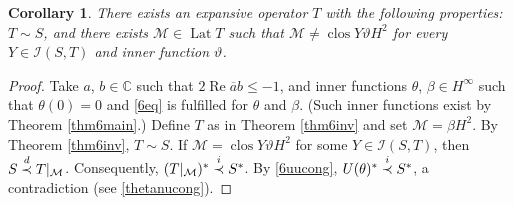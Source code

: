 \documentclass[a4paper,oneside,11pt]{amsart}
\numberwithin{equation}{section}
\theoremstyle{plain}
\newtheorem{corollary}[theorem]{Corollary}
\theoremstyle{definition}
\begin{document}
\begin{corollary} \label{cor6} There exists an expansive operator $T$ with the following properties:  $T\sim S$, and there exists 
$\mathcal M\in \operatorname{Lat}T$ such that $\mathcal M\neq\operatorname{clos}Y\vartheta H^2$ for every $Y\in\mathcal I(S,T)$ and 
inner function $\vartheta$. 
\end{corollary}

\begin{proof} Take $a$, $b\in\mathbb C$ such that $2\operatorname{Re}\overline ab\leq -1$, and inner functions
$\theta$, $\beta\in H^\infty$ such that $\theta(0)=0$ and \eqref{6eq} is fulfilled for $\theta$ and $\beta$. 
(Such inner functions exist by Theorem \ref{thm6main}.) Define $T$ as in Theorem \ref{thm6inv} and set $\mathcal M= \beta H^2$. 
By Theorem \ref{thm6inv}, $T\sim S$. If $\mathcal M=\operatorname{clos}Y\vartheta H^2$ for some $Y\in\mathcal I(S,T)$, then 
$S\buildrel d\over\prec T|_{\mathcal M}$. Consequently, $(T|_{\mathcal M})^*\buildrel i\over\prec S^*$. 
By \eqref{6uucong}, $U(\theta)^* \buildrel i\over\prec S^*$, a contradiction (see \eqref{thetanucong}).
\end{proof}
\end{document}
